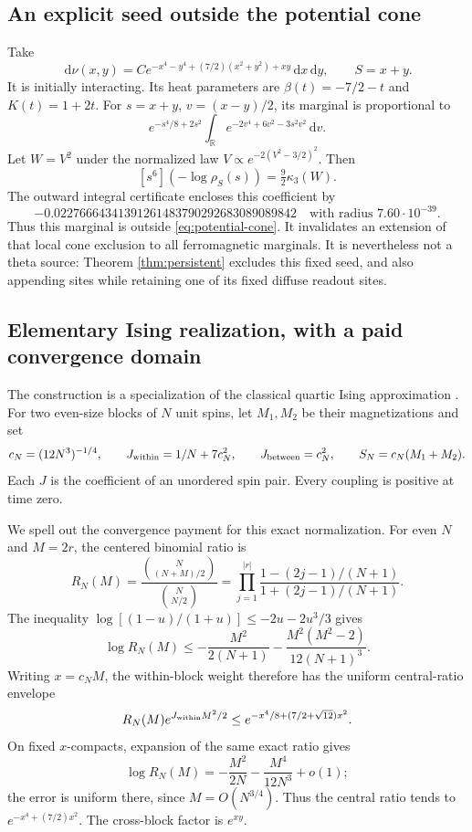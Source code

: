 \documentclass[11pt]{article}
\theoremstyle{remark}
\newcommand{\R}{\mathbb R}
\newcommand{\dd}{\,\mathrm d}
\numberwithin{equation}{section}
\begin{document}
\subsection{An explicit seed outside the potential cone}
Take
\begin{equation}\label{eq:two-seed}
 \dd\nu(x,y)=C e^{-x^4-y^4+(7/2)(x^2+y^2)+xy}\dd x\dd y,
 \qquad S=x+y.
\end{equation}
It is initially interacting. Its heat parameters are
\(\beta(t)=-7/2-t\) and \(K(t)=1+2t\).
For \(s=x+y\), \(v=(x-y)/2\), its marginal is proportional to
\[
 e^{-s^4/8+2s^2}
 \int_\R e^{-2v^4+6v^2-3s^2v^2}\dd v.
\]
Let \(W=V^2\) under the normalized law
\(V\propto e^{-2(V^2-3/2)^2}\). Then
\begin{equation}\label{eq:sixth}
 [s^6](-\log\rho_S(s))=\tfrac92\kappa_3(W).
\end{equation}
The outward integral certificate \cite{records} encloses this coefficient
by
\[
 -0.02276664341391261483790292683089089842
 \quad\text{with radius }7.60\cdot10^{-39}.
\]
Thus this marginal is outside \eqref{eq:potential-cone}. It invalidates
an extension of that local cone exclusion to all ferromagnetic marginals.
It is nevertheless not a theta source: Theorem \ref{thm:persistent}
excludes this fixed seed, and also appending sites while retaining one
of its fixed diffuse readout sites.

\subsection{Elementary Ising realization, with a paid convergence domain}
The construction is a specialization of the classical quartic Ising
approximation \cite{sg}. For two even-size blocks of \(N\) unit spins,
let \(M_1,M_2\) be their magnetizations and set
\begin{equation}\label{eq:ising}
 c_N=(12N^3)^{-1/4},\qquad
 J_{\rm within}=1/N+7c_N^2,\qquad
 J_{\rm between}=c_N^2,\qquad
 S_N=c_N(M_1+M_2).
\end{equation}
Each \(J\) is the coefficient of an unordered spin pair.
Every coupling is positive at time zero.

We spell out the convergence payment for this exact normalization.
For even \(N\) and \(M=2r\), the centered binomial ratio is
\[
 R_N(M)=\frac{\binom N{(N+M)/2}}{\binom N{N/2}}
 =\prod_{j=1}^{|r|}
 \frac{1-(2j-1)/(N+1)}{1+(2j-1)/(N+1)}.
\]
The inequality \(\log[(1-u)/(1+u)]\le-2u-2u^3/3\) gives
\begin{equation}\label{eq:binomial}
 \log R_N(M)\le-\frac{M^2}{2(N+1)}
  -\frac{M^2(M^2-2)}{12(N+1)^3}.
\end{equation}
Writing \(x=c_NM\), the within-block weight therefore has the uniform
central-ratio envelope
\begin{equation}\label{eq:envelope}
 R_N(M)e^{J_{\rm within}M^2/2}
 \le e^{-x^4/8+(7/2+\sqrt{12})x^2}.
\end{equation}
On fixed \(x\)-compacts, expansion of the same exact ratio gives
\[
 \log R_N(M)=-\frac{M^2}{2N}-\frac{M^4}{12N^3}+o(1);
\]
the error is uniform there, since \(M=O(N^{3/4})\).
Thus the central ratio tends to \(e^{-x^4+(7/2)x^2}\).
The cross-block factor is \(e^{xy}\).
\end{document}
